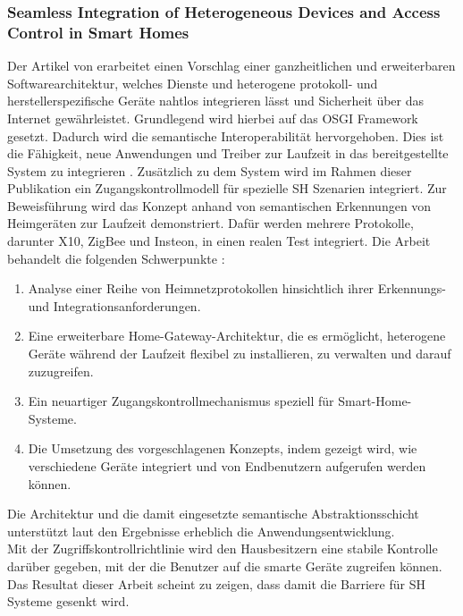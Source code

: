         \subsubsection*{Seamless Integration of Heterogeneous Devices and Access Control in Smart Homes}
            Der Artikel von \cite{Kim2012} erarbeitet einen Vorschlag einer ganzheitlichen und erweiterbaren 
            Softwarearchitektur, welches Dienste und heterogene protokoll- und herstellerspezifische Geräte 
            nahtlos integrieren lässt und Sicherheit über das Internet gewährleistet. Grundlegend wird hierbei auf das 
            \acs{OSGI} Framework gesetzt. Dadurch wird die semantische Interoperabilität hervorgehoben. Dies ist die Fähigkeit, 
            neue Anwendungen und Treiber zur Laufzeit in das bereitgestellte System zu integrieren \cite{Kim2012}. 
            Zusätzlich zu dem System wird im Rahmen dieser Publikation ein Zugangskontrollmodell für spezielle \acl{SH} 
            Szenarien integriert. Zur Beweisführung wird das Konzept anhand von semantischen Erkennungen von Heimgeräten zur 
            Laufzeit demonstriert. Dafür werden mehrere Protokolle, darunter X10, ZigBee und Insteon, in einen realen Test 
            integriert. Die Arbeit behandelt die folgenden Schwerpunkte \cite{Kim2012}:
            \begin{enumerate}
                \item Analyse einer Reihe von Heimnetzprotokollen hinsichtlich ihrer Erkennungs- und Integrationsanforderungen.
                \item Eine erweiterbare Home-Gateway-Architektur, die es ermöglicht, heterogene Geräte während der Laufzeit flexibel zu installieren, zu verwalten und darauf zuzugreifen.
                \item Ein neuartiger Zugangskontrollmechanismus speziell für Smart-Home-Systeme.
                \item Die Umsetzung des vorgeschlagenen Konzepts, indem gezeigt wird, wie verschiedene Geräte integriert und von Endbenutzern aufgerufen werden können.
            \end{enumerate}
            Die Architektur und die damit eingesetzte semantische Abstraktionsschicht unterstützt laut den Ergebnisse 
            erheblich die Anwendungsentwicklung. 
            \\
            Mit der Zugriffskontrollrichtlinie wird den Hausbesitzern eine stabile Kontrolle darüber gegeben, mit der 
            die Benutzer auf die smarte Geräte zugreifen können. Das Resultat dieser Arbeit scheint zu zeigen, dass damit 
            die Barriere für \acl{SH} Systeme gesenkt wird. 

